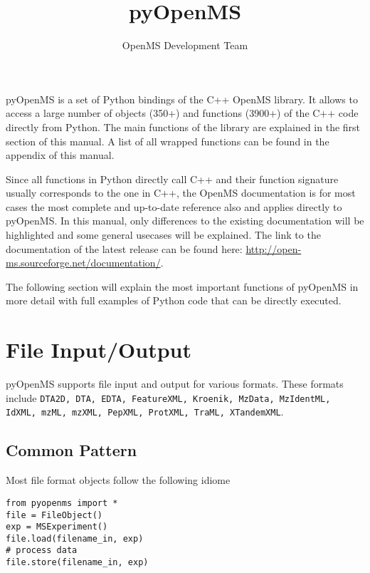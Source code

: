 \documentclass[10pt]{article}
\title{pyOpenMS }
\author{OpenMS Development Team}
\date{}
\begin{document}
  \maketitle

  pyOpenMS is a set of Python bindings of the C++ OpenMS library. It allows to
  access a large number of objects (350+) and functions (3900+) of the C++
  code directly from Python. 
  The main functions of the library are explained in the first section of this
  manual. A list of all wrapped functions can be found in the appendix of this
  manual.

  Since all functions in Python directly call C++ and their function signature
  usually corresponds to the one in C++, the OpenMS documentation is for most
  cases the most complete and up-to-date reference also and applies directly
  to pyOpenMS. In this manual, only differences to the existing documentation
  will be highlighted and some general usecases will be explained. The link to
  the documentation of the latest release can be found here:
  \url{http://open-ms.sourceforge.net/documentation/}.

  \tableofcontents

  \pagebreak

  The following section will explain the most important functions of pyOpenMS
  in more detail with full examples of Python code that can be directly
  executed.

\section{File Input/Output}

  pyOpenMS supports file input and output for various formats. These formats
  include \texttt{DTA2D, DTA, EDTA, FeatureXML, Kroenik, MzData, MzIdentML, IdXML, mzML,
  mzXML, PepXML, ProtXML, TraML, XTandemXML}.

\subsection{Common Pattern}

Most file format objects follow the following idiome

\begin{verbatim}
from pyopenms import *
file = FileObject() 
exp = MSExperiment() 
file.load(filename_in, exp)
# process data
file.store(filename_in, exp)
\end{verbatim}
\end{document}
